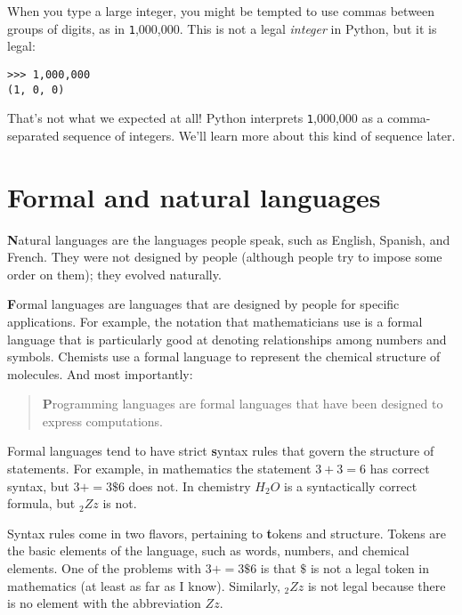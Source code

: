 \documentclass[
DIV=11,
fontsize=12,
twoside,
headinclude=false,
titlepage=firstiscover,
abstract=true,
headsepline=true,
footsepline=true,
chapterprefix=true, %
headings=big,
bibliography=totoc,%
captions=tableheading
]{scrbook}
\theoremstyle{definition}
\begin{document}
When you type a large integer, you might be tempted to use commas
between groups of digits, as in {\texttt 1,000,000}.  This is not a
legal {\em integer} in Python, but it is legal:

\begin{lstlisting}
>>> 1,000,000
(1, 0, 0)
\end{lstlisting}
%
That's not what we expected at all!  Python interprets {\texttt
  1,000,000} as a comma-separated sequence of integers.  We'll learn
more about this kind of sequence later.




\section{Formal and natural languages}

{\textbf Natural languages} are the languages people speak,
such as English, Spanish, and French.  They were not designed
by people (although people try to impose some order on them);
they evolved naturally.

{\textbf Formal languages} are languages that are designed by people for
specific applications.  For example, the notation that mathematicians
use is a formal language that is particularly good at denoting
relationships among numbers and symbols.  Chemists use a formal
language to represent the chemical structure of molecules.  And
most importantly:

\begin{quote}
{\textbf Programming languages are formal languages that have been
designed to express computations.}
\end{quote}

Formal languages tend to have strict {\textbf syntax} rules that
govern the structure of statements.
For example, in mathematics the statement
$3 + 3 = 6$ has correct syntax, but
$3 + = 3 \$ 6$ does not.  In chemistry
$H_2O$ is a syntactically correct formula, but $_2Zz$ is not.

Syntax rules come in two flavors, pertaining to {\textbf tokens} and
structure.  Tokens are the basic elements of the language, such as
words, numbers, and chemical elements.  One of the problems with
$3 += 3 \$ 6$ is that \( \$ \) is not a legal token in mathematics
(at least as far as I know).  Similarly, $_2Zz$ is not legal because
there is no element with the abbreviation $Zz$.
\end{document}
